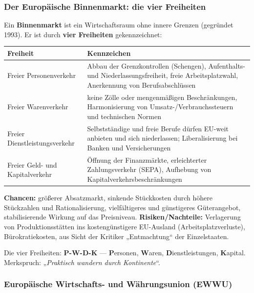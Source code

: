 \documentclass[11pt, a4paper]{article}
\begin{document}
\subsubsection{Der Europäische Binnenmarkt: die vier Freiheiten}

Ein \textbf{Binnenmarkt} ist ein Wirtschaftsraum ohne innere Grenzen (gegründet 1993). Er
ist durch \textbf{vier Freiheiten} gekennzeichnet:

\begin{center}
\begin{tabular}{p{4.2cm} p{9.6cm}}
\toprule
\textbf{Freiheit} & \textbf{Kennzeichen}\\
\midrule
Freier Personenverkehr & Abbau der Grenzkontrollen (Schengen), Aufenthalts- und Niederlassungsfreiheit, freie Arbeitsplatzwahl, Anerkennung von Berufsabschlüssen\\
Freier Warenverkehr & keine Zölle oder mengenmäßigen Beschränkungen, Harmonisierung von Umsatz-/Verbrauchssteuern und technischen Normen\\
Freier Dienstleistungsverkehr & Selbstständige und freie Berufe dürfen EU-weit anbieten und sich niederlassen; Liberalisierung bei Banken und Versicherungen\\
Freier Geld- und Kapitalverkehr & Öffnung der Finanzmärkte, erleichterter Zahlungsverkehr (SEPA), Aufhebung von Kapitalverkehrsbeschränkungen\\
\bottomrule
\end{tabular}
\end{center}

\textbf{Chancen:} größerer Absatzmarkt, sinkende Stückkosten durch höhere Stückzahlen und
Rationalisierung, vielfältigeres und günstigeres Güterangebot, stabilisierende Wirkung auf
das Preisniveau. \textbf{Risiken/Nachteile:} Verlagerung von Produktionsstätten ins
kostengünstigere EU-Ausland (Arbeitsplatzverluste), Bürokratiekosten, aus Sicht der
Kritiker „Entmachtung`` der Einzelstaaten.

\begin{eselsbruecke}
Die vier Freiheiten: \textbf{P-W-D-K} --- \textbf{P}ersonen, \textbf{W}aren,
\textbf{D}ienstleistungen, \textbf{K}apital. Merkspruch: „\emph{Praktisch wandern durch
Kontinente}``.
\end{eselsbruecke}

\subsubsection{Europäische Wirtschafts- und Währungsunion (EWWU)}
\end{document}
